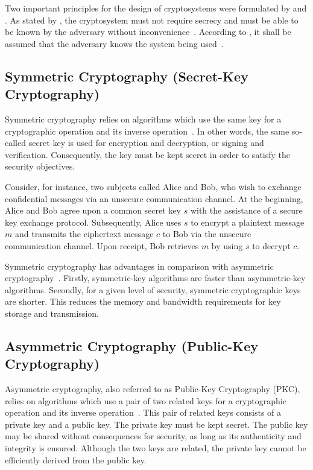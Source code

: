 Two important principles for the design of cryptosystems were formulated by \citeauthor{Kerckhoffs1883} and \citeauthor{Shannon1949}.
As stated by \citeauthor{Kerckhoffs1883}, the cryptosystem must not require secrecy and must be able to be known by the adversary without inconvenience~\cite{Kerckhoffs1883}.
According to \citeauthor{Shannon1949}, it shall be assumed that the adversary knows the system being used~\cite{Shannon1949}.

\subsection{Symmetric Cryptography (Secret-Key Cryptography)}
Symmetric cryptography relies on algorithms which use the same key for a cryptographic operation and its inverse operation~\cite{Barker2020,Eckert2023}.
In other words, the same so-called secret key is used for encryption and decryption, or signing and verification.
Consequently, the key must be kept secret in order to satisfy the security objectives.

Consider, for instance, two subjects called Alice and Bob, who wish to exchange confidential messages via an unsecure communication channel.
At the beginning, Alice and Bob agree upon a common secret key $s$ with the assistance of a secure key exchange protocol.
Subsequently, Alice uses $s$ to encrypt a plaintext message $m$ and transmits the ciphertext message $c$ to Bob via the unsecure communication channel.
Upon receipt, Bob retrieves $m$ by using $s$ to decrypt $c$.

Symmetric cryptography has advantages in comparison with asymmetric cryptography~\cite{Barker2020}.
Firstly, symmetric-key algorithms are faster than asymmetric-key algorithms.
Secondly, for a given level of security, symmetric cryptographic keys are shorter.
This reduces the memory and bandwidth requirements for key storage and transmission.

\subsection{Asymmetric Cryptography (Public-Key Cryptography)}
Asymmetric cryptography, also referred to as Public-Key Cryptography (PKC), relies on algorithms which use a pair of two related keys for a cryptographic operation and its inverse operation~\cite{Barker2020,CNSS2022,Eckert2023}.
This pair of related keys consists of a private key and a public key.
The private key must be kept secret.
The public key may be shared without consequences for security, as long as its authenticity and integrity is ensured.
Although the two keys are related, the private key cannot be efficiently derived from the public key.

